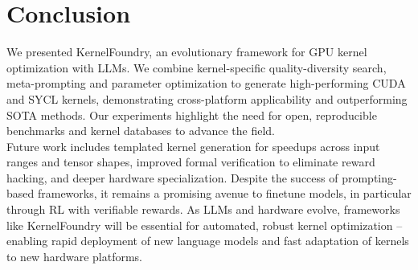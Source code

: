 %
%
%
%

\section{Conclusion} \label{sec:conclusion}

We presented KernelFoundry, an evolutionary framework for GPU kernel optimization with LLMs. 
We combine kernel-specific quality-diversity search, meta-prompting and parameter optimization to generate high-performing CUDA and SYCL kernels, demonstrating cross-platform applicability and outperforming SOTA methods.
Our experiments highlight the need for open, reproducible benchmarks and kernel databases to advance the field.\\
Future work includes templated kernel generation for speedups across input ranges and tensor shapes, improved formal verification to eliminate reward hacking, and deeper hardware specialization. Despite the success of prompting-based frameworks, it remains a promising avenue  to finetune models, in particular through RL with verifiable rewards. As LLMs and hardware evolve, frameworks like KernelFoundry will be essential for automated, robust kernel optimization -- enabling rapid deployment of new language models and fast adaptation of kernels to new hardware platforms.
